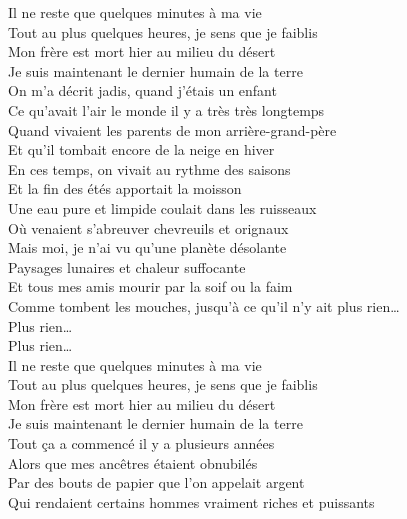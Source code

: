 \documentclass{novel}
\begin{document}
\begin{multicols}{2}
Il ne reste que quelques minutes à ma vie \\
Tout au plus quelques heures, je sens que je faiblis \\
Mon frère est mort hier au milieu du désert \\
Je suis maintenant le dernier humain de la terre \\

On m'a décrit jadis, quand j'étais un enfant \\
Ce qu'avait l'air le monde il y a très très longtemps \\
Quand vivaient les parents de mon arrière-grand-père \\
Et qu'il tombait encore de la neige en hiver \\

En ces temps, on vivait au rythme des saisons \\
Et la fin des étés apportait la moisson \\
Une eau pure et limpide coulait dans les ruisseaux \\
Où venaient s'abreuver chevreuils et orignaux \\

Mais moi, je n'ai vu qu'une planète désolante \\
Paysages lunaires et chaleur suffocante \\
Et tous mes amis mourir par la soif ou la faim \\
Comme tombent les mouches, jusqu'à ce qu'il n'y ait plus rien… \\

Plus rien… \\
Plus rien… \\

Il ne reste que quelques minutes à ma vie \\
Tout au plus quelques heures, je sens que je faiblis \\
Mon frère est mort hier au milieu du désert \\
Je suis maintenant le dernier humain de la terre \\

Tout ça a commencé il y a plusieurs années \\
Alors que mes ancêtres étaient obnubilés \\
Par des bouts de papier que l'on appelait argent \\
Qui rendaient certains hommes vraiment riches et puissants \\


\end{multicols}
\end{document}
